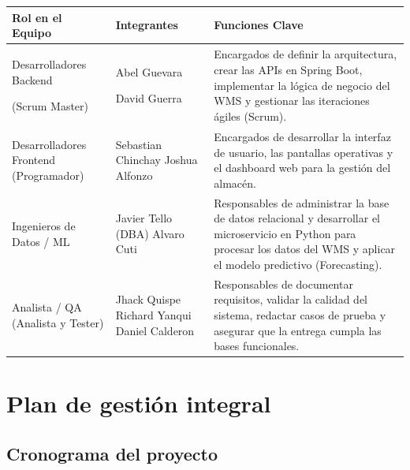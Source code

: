 \documentclass[11pt, a4paper, oneside]{report}
\begin{document}
\begin{table}[H]
\centering
\renewcommand{\arraystretch}{1.35}
\setlength{\tabcolsep}{8pt}

\begin{tabularx}{\textwidth}{
    |>{\raggedright\arraybackslash}p{}
    |>{\raggedright\arraybackslash}p{}
    |>{\raggedright\arraybackslash}X|
}
\hline

\rowcolor{upeu_dark}
\color{white}\bfseries Rol en el Equipo
&
\centering\color{white}\bfseries Integrantes
&
\centering\arraybackslash\color{white}\bfseries Funciones Clave
\\
\hline
\rowcolor{gray!10}
Desarrolladores Backend

(Scrum Master)
&
Abel Guevara

David Guerra
&
Encargados de definir la arquitectura, crear las APIs en Spring Boot, implementar la lógica de negocio del WMS y gestionar las iteraciones ágiles (Scrum).
\\
Desarrolladores Frontend (Programador)
&
Sebastian Chinchay 
Joshua Alfonzo
&
Encargados de desarrollar la interfaz de usuario, las pantallas operativas y el dashboard web para la gestión del almacén.
\\
\rowcolor{gray!10}
Ingenieros de Datos / ML
&
Javier Tello (DBA)
Alvaro Cuti
&
Responsables de administrar la base de datos relacional y desarrollar el microservicio en Python para procesar los datos del WMS y aplicar el modelo predictivo (Forecasting).
\\
Analista / QA (Analista y Tester)
&
Jhack Quispe 
Richard Yanqui 
Daniel Calderon
&
Responsables de documentar requisitos, validar la calidad del sistema, redactar casos de prueba y asegurar que la entrega cumpla las bases funcionales.
\\
\hline
\end{tabularx}
\end{table}

\section{Plan de gestión integral}

\subsection{Cronograma del proyecto}
\end{document}
